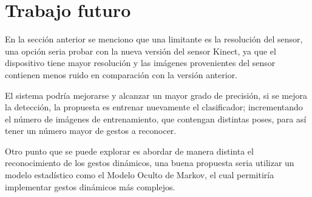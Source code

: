 \section{Trabajo futuro}\label{futureWork}  

En la sección anterior se menciono que una limitante es la resolución del sensor, una opción seria probar con la nueva versión del sensor Kinect, ya que el dispositivo tiene mayor resolución y las imágenes provenientes del sensor contienen menos ruido en comparación con la versión anterior. 

El sistema podría mejorarse y alcanzar un mayor grado de precisión, si se mejora la detección, la propuesta es entrenar nuevamente el clasificador; incrementando el número de imágenes de entrenamiento, que contengan distintas poses, para así tener un número mayor de gestos a reconocer.

Otro punto que se puede explorar es abordar de manera distinta el reconocimiento de los gestos dinámicos, una buena propuesta seria utilizar un modelo estadístico como el Modelo Oculto de Markov, el cual permitiría implementar gestos dinámicos más complejos.  

\newpage
